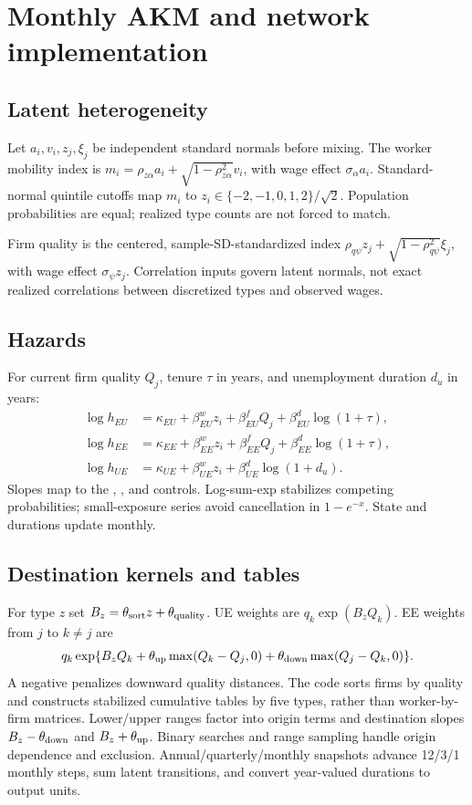 \documentclass[11pt,letterpaper]{article}
\newcommand{\code}[1]{\texttt{\detokenize{#1}}}
\begin{document}
\section{Monthly AKM and network implementation}\label{app:empirical}
\subsection{Latent heterogeneity}
Let $a_i,v_i,z_j,\xi_j$ be independent standard normals before mixing.
The worker mobility index is
$m_i=\rho_{z\alpha}a_i+\sqrt{1-\rho_{z\alpha}^2}v_i$, with wage effect
$\sigma_\alpha a_i$. Standard-normal quintile cutoffs map $m_i$ to
$z_i\in\{-2,-1,0,1,2\}/\sqrt2$. Population probabilities are equal;
realized type counts are not forced to match.

Firm quality is the centered, sample-SD-standardized index
$\rho_{q\psi}z_j+\sqrt{1-\rho_{q\psi}^2}\xi_j$, with wage effect
$\sigma_\psi z_j$. Correlation inputs govern latent normals, not exact
realized correlations between discretized types and observed wages.

\subsection{Hazards}
For current firm quality $Q_j$, tenure $\tau$ in years, and unemployment
duration $d_u$ in years:
\begin{align}
\log h_{EU}&=\kappa_{EU}+\beta^w_{EU}z_i+\beta^f_{EU}Q_j+
 \beta^d_{EU}\log(1+\tau),\\
\log h_{EE}&=\kappa_{EE}+\beta^w_{EE}z_i+\beta^f_{EE}Q_j+
 \beta^d_{EE}\log(1+\tau),\\
\log h_{UE}&=\kappa_{UE}+\beta^w_{UE}z_i+
 \beta^d_{UE}\log(1+d_u).
\end{align}
Slopes map to the \code{eu_*}, \code{ee_*}, and \code{ue_*} controls.
Log-sum-exp stabilizes competing probabilities; small-exposure series
avoid cancellation in $1-e^{-x}$. State and durations update monthly.

\subsection{Destination kernels and tables}
For type $z$ set $B_z=\theta_{\rm sort}z+\theta_{\rm quality}$.
UE weights are $q_k\exp(B_zQ_k)$. EE weights from $j$ to $k\ne j$ are
\begin{equation}
q_k\exp\{B_zQ_k+\theta_{\rm up}\max(Q_k-Q_j,0)
                 +\theta_{\rm down}\max(Q_j-Q_k,0)\}.
\end{equation}
A negative \code{theta_down} penalizes downward quality distances.
The code sorts firms by quality and constructs stabilized cumulative
tables by five types, rather than worker-by-firm matrices. Lower/upper
ranges factor into origin terms and destination slopes
$B_z-\theta_{\rm down}$ and $B_z+\theta_{\rm up}$.
Binary searches and range sampling handle origin dependence and exclusion.
Annual/quarterly/monthly snapshots advance 12/3/1 monthly steps, sum latent
transitions, and convert year-valued durations to output units.
\end{document}
